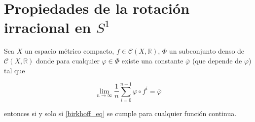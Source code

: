 \section{Propiedades de la rotación irracional en $S^1$}

\begin{lema}\label{lema_varphi_m}
	Sea $X$ un espacio métrico compacto, $f \in \mathcal{C}(X,\mathbb{R})$, $\Phi$ un subconjunto denso de $\mathcal{C}(X, \mathbb{R})$ donde para cualquier $\varphi \in \Phi$ existe una constante $\overline{\varphi}$ (que depende de $\varphi$) tal que
	
	\begin{equation}\label{birkhoff_eq}
		\lim_{n \rightarrow \infty} \frac{1}{n} \sum_{i=0}^{n-1} \varphi \circ f^i = \overline{\varphi}
	\end{equation}
	
	entonces si y solo si \eqref{birkhoff_eq} se cumple para cualquier función continua.
\end{lema}

